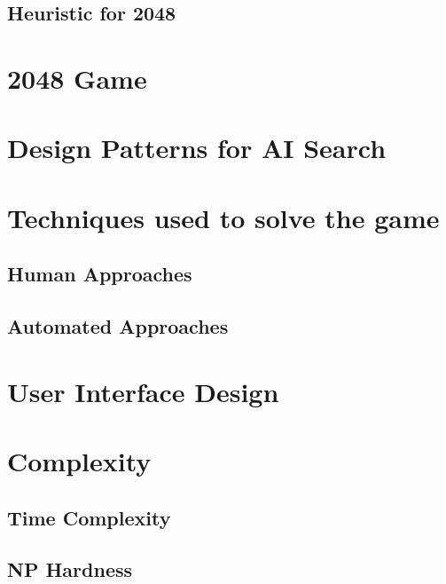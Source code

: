 \documentclass{article}
\begin{document}
\subsection{Heuristic for 2048}

\section{2048 Game}
\section{Design Patterns for AI Search}
\section{Techniques used to solve the game}
\subsection{Human Approaches}
\subsection{Automated Approaches}
\section{User Interface Design}
\section{Complexity}
\subsection{Time Complexity}
\subsection{NP Hardness}



\end{document}
